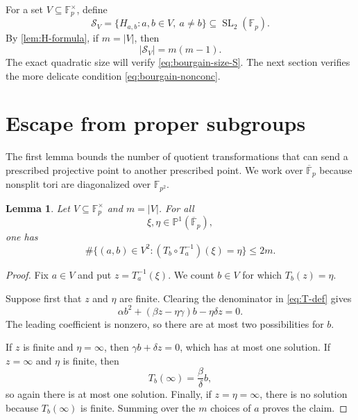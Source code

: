 \documentclass[11pt,reqno]{amsart}
\numberwithin{equation}{section}
\newtheorem{lemma}[lemma]{Lemma}
\theoremstyle{definition}
\theoremstyle{remark}
\newcommand{\F}{\mathbb F}
\newcommand{\Pone}{\mathbb P^1}
\newcommand{\SL}{\operatorname{SL}}
\newcommand{\cS}{\mathcal S}
\begin{document}
For a set $V\subseteq\F_p^\times$, define
\begin{equation}\label{eq:S-V}
  \cS_V=\{H_{a,b}:a,b\in V,\ a\ne b\}\subseteq\SL_2(\F_p).
\end{equation}
By \cref{lem:H-formula}, if $m=|V|$, then
\begin{equation}\label{eq:S-size-exact}
  |\cS_V|=m(m-1).
\end{equation}
The exact quadratic size will verify \eqref{eq:bourgain-size-S}.  The next section verifies the more delicate condition \eqref{eq:bourgain-nonconc}.

\section{Escape from proper subgroups}\label{sec:escape}

The first lemma bounds the number of quotient transformations that can send a prescribed projective point to another prescribed point.  We work over $\overline{\F}_p$ because nonsplit tori are diagonalized over $\F_{p^2}$.

\begin{lemma}\label{lem:evaluation}
Let $V\subseteq\F_p^\times$ and $m=|V|$.  For all
\[
  \xi,\eta\in\Pone(\overline{\F}_p),
\]
one has
\begin{equation}\label{eq:evaluation-bound}
  \#\{(a,b)\in V^2:(T_b\circ T_a^{-1})(\xi)=\eta\}\le2m.
\end{equation}
\end{lemma}

\begin{proof}
Fix $a\in V$ and put $z=T_a^{-1}(\xi)$.  We count $b\in V$ for which $T_b(z)=\eta$.

Suppose first that $z$ and $\eta$ are finite.  Clearing the denominator in \eqref{eq:T-def} gives
\begin{equation}\label{eq:b-quadratic}
  \alpha b^2+(\beta z-\eta\gamma)b-\eta\delta z=0.
\end{equation}
The leading coefficient is nonzero, so there are at most two possibilities for $b$.

If $z$ is finite and $\eta=\infty$, then $\gamma b+\delta z=0$, which has at most one solution.  If $z=\infty$ and $\eta$ is finite, then
\[
  T_b(\infty)=\frac{\beta}{\delta}b,
\]
so again there is at most one solution.  Finally, if $z=\eta=\infty$, there is no solution because $T_b(\infty)$ is finite.  Summing over the $m$ choices of $a$ proves the claim.
\end{proof}
\end{document}
